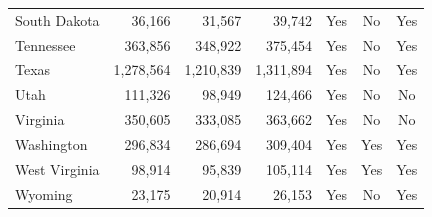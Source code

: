 \begin{tabular}{lrrrccc}
South Dakota           &    36,166 &    31,567 &    39,742 & Yes & No & Yes \\
Tennessee              &   363,856 &   348,922 &   375,454 & Yes & No & Yes \\
Texas                  & 1,278,564 & 1,210,839 & 1,311,894 & Yes & No & Yes \\
Utah                   &   111,326 &    98,949 &   124,466 & Yes & No & No \\
Virginia               &   350,605 &   333,085 &   363,662 & Yes & No & No \\
Washington             &   296,834 &   286,694 &   309,404 & Yes & Yes & Yes \\
West Virginia          &    98,914 &    95,839 &   105,114 & Yes & Yes & Yes \\
Wyoming                &    23,175 &    20,914 &    26,153 & Yes & No & Yes \\
\hline
\end{tabular}
